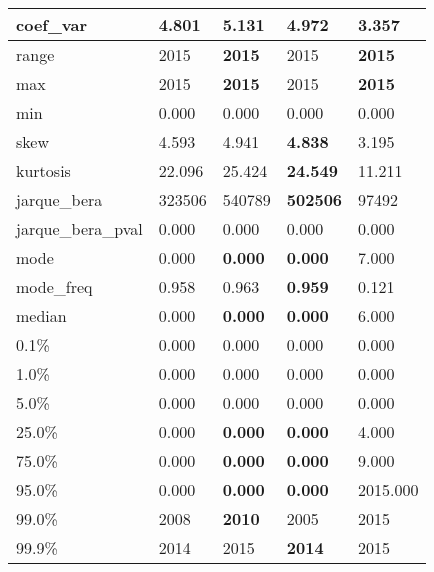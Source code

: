 \begin{table}[H]
\begin{tabular}{|l|m{10em}|m{10em}|m{10em}|m{10em}|}
\hline coef\_var & 4.801 & 5.131 & \bfseries 4.972 & \cellcolor[rgb]{0.9, 0.54, 0.52} 3.357 \\
\hline range & 2015 & \bfseries 2015 & \cellcolor[rgb]{0.9, 0.54, 0.52} 2015 & \bfseries 2015 \\
\hline max & 2015 & \bfseries 2015 & \cellcolor[rgb]{0.9, 0.54, 0.52} 2015 & \bfseries 2015 \\
\hline min & 0.000 & 0.000 & 0.000 & 0.000 \\
\hline skew & 4.593 & 4.941 & \bfseries 4.838 & \cellcolor[rgb]{0.9, 0.54, 0.52} 3.195 \\
\hline kurtosis & 22.096 & 25.424 & \bfseries 24.549 & \cellcolor[rgb]{0.9, 0.54, 0.52} 11.211 \\
\hline jarque\_bera & 323506 & 540789 & \bfseries 502506 & \cellcolor[rgb]{0.9, 0.54, 0.52} 97492 \\
\hline jarque\_bera\_pval & 0.000 & 0.000 & 0.000 & 0.000 \\
\hline mode & 0.000 & \bfseries 0.000 & \bfseries 0.000 & \cellcolor[rgb]{0.9, 0.54, 0.52} 7.000 \\
\hline mode\_freq & 0.958 & 0.963 & \bfseries 0.959 & \cellcolor[rgb]{0.9, 0.54, 0.52} 0.121 \\
\hline median & 0.000 & \bfseries 0.000 & \bfseries 0.000 & \cellcolor[rgb]{0.9, 0.54, 0.52} 6.000 \\
\hline 0.1\% & 0.000 & 0.000 & 0.000 & 0.000 \\
\hline 1.0\% & 0.000 & 0.000 & 0.000 & 0.000 \\
\hline 5.0\% & 0.000 & 0.000 & 0.000 & 0.000 \\
\hline 25.0\% & 0.000 & \bfseries 0.000 & \bfseries 0.000 & \cellcolor[rgb]{0.9, 0.54, 0.52} 4.000 \\
\hline 75.0\% & 0.000 & \bfseries 0.000 & \bfseries 0.000 & \cellcolor[rgb]{0.9, 0.54, 0.52} 9.000 \\
\hline 95.0\% & 0.000 & \bfseries 0.000 & \bfseries 0.000 & \cellcolor[rgb]{0.9, 0.54, 0.52} 2015.000 \\
\hline 99.0\% & 2008 & \bfseries 2010 & 2005 & \cellcolor[rgb]{0.9, 0.54, 0.52} 2015 \\
\hline 99.9\% & 2014 & \cellcolor[rgb]{0.9, 0.54, 0.52} 2015 & \bfseries 2014 & \cellcolor[rgb]{0.9, 0.54, 0.52} 2015 \\
\hline
\end{tabular}
\end{table}
